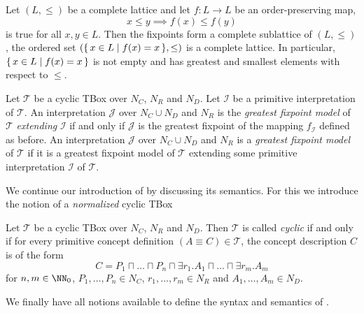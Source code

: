 \begin{Theorem}
  \label{thm:tarski-fixpoint-theorem}
  Let $(L, \leq)$ be a complete lattice and let $f \colon L \to L$ be an order-preserving
  map, \ie
  \begin{equation*}
    x \leq y \implies f(x) \leq f(y)
  \end{equation*}
  is true for all $x, y \in L$.  Then the fixpoints form a complete sublattice of $(L,
  \leq)$, \ie the ordered set $({\{\, x \in L \mid f(x) = x \,\}}, \leq)$ is a complete
  lattice.  In particular, ${\{\, x \in L \mid f(x) = x \,\}}$ is not empty and has greatest
  and smallest elements with respect to $\leq$.
\end{Theorem}

\begin{Definition}
  \label{def:gfp-models}
  Let $\mathcal{T}$ be a cyclic TBox over $N_C$, $N_R$ and $N_D$.  Let $\mathcal{I}$ be a
  primitive interpretation of $\mathcal{T}$.  An interpretation $\mathcal{J}$ over $N_C
  \cup N_D$ and $N_R$ is the \emph{greatest fixpoint model} of $\mathcal{T}$
  \emph{extending} $\mathcal{I}$ if and only if $\mathcal{J}$ is the greatest fixpoint of
  the mapping $f_{\mathcal{I}}$ defined as before.  An interpretation $\mathcal{J}$ over
  $N_C \cup N_D$ and $N_R$ is a \emph{greatest fixpoint model} of $\mathcal{T}$ if it is a
  greatest fixpoint model of $\mathcal{T}$ extending some primitive interpretation
  $\mathcal{I}$ of $\mathcal{T}$.
\end{Definition}

We continue our introduction of \ELgfpbot by discussing its semantics.  For this we
introduce the notion of a \emph{normalized} cyclic TBox

\begin{Definition}
  \label{def:normalized-cyclic-TBox}
  Let $\mathcal{T}$ be a cyclic TBox over $N_C$, $N_R$ and $N_D$.  Then $\mathcal{T}$ is
  called \emph{cyclic} if and only if for every primitive concept definition $(A \equiv C)
  \in \mathcal{T}$, the concept description $C$ is of the form
  \begin{equation*}
    C = P_1 \sqcap \dots \sqcap P_n \sqcap \exists r_1. A_1 \sqcap \dots \sqcap \exists r_m. A_m
  \end{equation*}
  for $n, m \in \NN_0$, $P_1, \dots, P_n \in N_C$, $r_1, \dots, r_m \in N_R$ and $A_1,
  \dots, A_m \in N_D$.
\end{Definition}

We finally have all notions available to define the syntax and semantics of \ELgfpbot.

